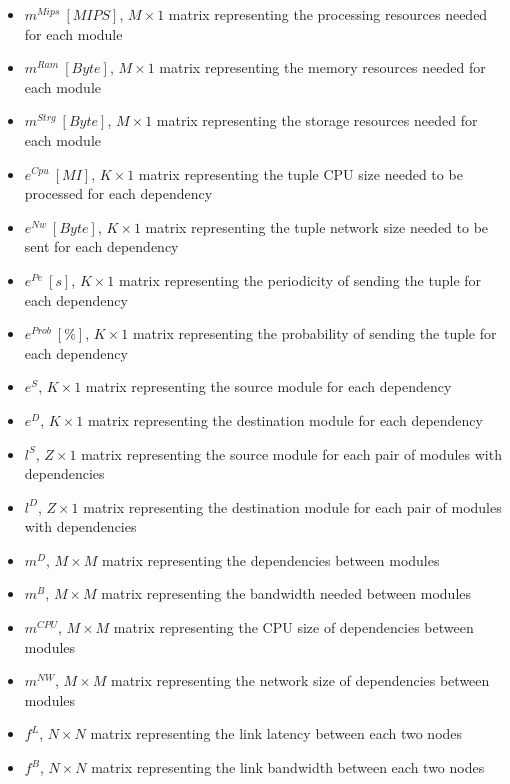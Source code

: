 \documentclass{article}
\begin{document}
\begin{itemize}
	\item $m^{Mips}~[MIPS]$, $M\times 1$ matrix representing the processing resources needed for each module
	\item $m^{Ram}~[Byte]$, $M\times 1$ matrix representing the memory resources needed for each module
	\item $m^{Strg}~[Byte]$, $M\times 1$ matrix representing the storage resources needed for each module\\
	
	\item $e^{Cpu}~[MI]$, $K\times 1$ matrix representing the tuple CPU size needed to be processed for each dependency
	\item $e^{Nw}~[Byte]$, $K\times 1$ matrix representing the tuple network size needed to be sent for each dependency
	\item $e^{Pe}~[s]$, $K\times 1$ matrix representing the periodicity of sending the tuple for each dependency
	\item $e^{Prob}~[\%]$, $K\times 1$ matrix representing the probability of sending the tuple for each dependency
	\item $e^{S}$, $K\times 1$ matrix representing the source module for each dependency
	\item $e^{D}$, $K\times 1$ matrix representing the destination module for each dependency\\
	
	\item $l^S$, $Z\times 1$ matrix representing the source module for each pair of modules with dependencies
	\item $l^D$, $Z\times 1$ matrix representing the destination module for each pair of modules with dependencies\\
	
	\item $m^D$, $M\times M$ matrix representing the dependencies between modules
	\item $m^B$, $M\times M$ matrix representing the bandwidth needed between modules
	\item $m^{CPU}$, $M\times M$ matrix representing the CPU size of dependencies between modules
	\item $m^{NW}$, $M\times M$ matrix representing the network size of dependencies between modules\\
	
	\item $f^L$, $N\times N$ matrix representing the link latency between each two nodes
	\item $f^B$, $N\times N$ matrix representing the link bandwidth between each two nodes\\
	

\end{itemize}
\end{document}
